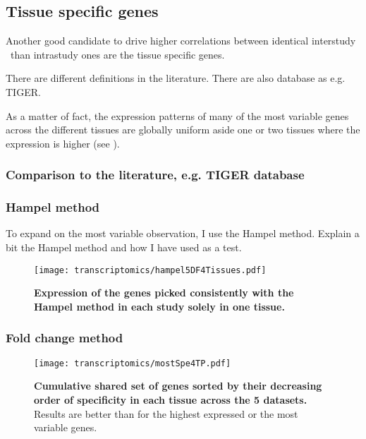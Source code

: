 \subsection{Tissue specific genes}\label{sub:TisSpeGene}

Another good candidate to drive higher correlations
between identical interstudy \treps\ than intrastudy ones are
the tissue specific genes.

There are different definitions in the literature.
There are also database as e.g. TIGER.

As a matter of fact, the expression patterns of many of
the most variable genes across the different tissues
are globally uniform aside one or two tissues
where the expression is higher (see ).

\subsubsection{Comparison to the literature, e.g. TIGER database}\label{subsub:Tiger}

\subsubsection{Hampel method}\label{subsub:Hampel}
To expand on the most variable observation, I use the Hampel method.
Explain a bit the Hampel method and how I have used as a test.

\begin{figure}[!htpb]
    \texttt{[image: transcriptomics/hampel5DF4Tissues.pdf]}\centering
    \caption[Expression of the genes picked with Hampel method]{\label{fig:hampelExp}%
    \textbf{Expression of the genes picked consistently with the Hampel method
    in each study solely in one tissue.}}
\end{figure}

\subsubsection{Fold change method}\label{subsub:TisSpeGeneMethodPerso}

\begin{figure}[!htpb]
    \texttt{[image: transcriptomics/mostSpe4TP.pdf]}\centering
    \caption[Cumulative shared set of genes sorted by their specificity in each
    tissue across the 5 datasets]{\label{fig:mostSpe4T}\textbf{Cumulative shared
    set of genes sorted by their decreasing order of specificity in each tissue
    across the 5 datasets.} Results are better than for the highest expressed or
    the most variable genes.}
\end{figure}

